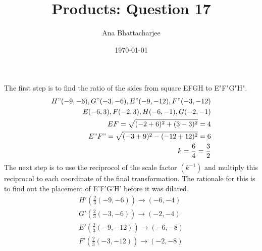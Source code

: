 \documentclass{article}
\begin{document}
\title{Products: Question 17}
\author{Ana Bhattacharjee}
\date{\today}
\maketitle{}

\begin{center}
The first step is to find the ratio of the sides from square EFGH to E"F"G"H".
\begin{align}
H" (-9, -6), G" (-3, -6), E" (-9, -12), F" (-3, -12) \\
E (-6, 3), F (-2, 3), H (-6, -1), G (-2, -1) \\
EF = \sqrt{(-2 + 6)^2 + (3 - 3)^2} = 4 \\
E"F" = \sqrt{(-3 + 9)^2 - (-12 + 12)^2} = 6 \\
k = \frac{6}{4} = \frac{3}{2} \\
\end{align}
The next step is to use the reciprocol of the scale factor $(k^{-1})$ and multiply this reciprocol to each coordinate of the final transformation. The rationale for this is to find out the placement of E'F'G'H' before it was dilated.
\begin{align}
H' (\frac{2}{3}(-9, -6)) \rightarrow (-6, -4) \\
G' (\frac{2}{3}(-3, -6)) \rightarrow (-2, -4 ) \\
E' (\frac{2}{3}(-9, -12)) \rightarrow (-6, -8) \\
F' (\frac{2}{3}(-3, -12)) \rightarrow (-2, -8)
\end{align}
\end{center}
\end{document}
